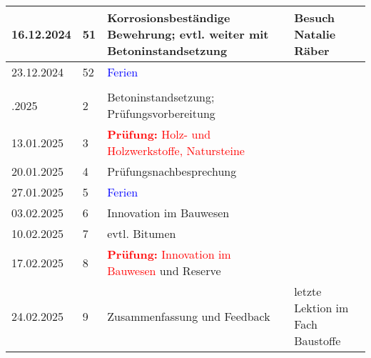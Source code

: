 \documentclass[
11pt,
captions=tableheading,
headings=big,
headsepline,
footsepline, 
captions=tableheading,
parskip=half-,
]{scrartcl}
\newcommand{\red}[1]{\textcolor{red}{#1}}
\begin{document}
\begin{table}[H]
\begin{tabular}{llp{8.5cm}p{3.5cm}}
        16.12.2024     & 51          & Korrosionsbeständige Bewehrung; evtl. weiter mit Betoninstandsetzung           & Besuch Natalie Räber             \\
        \midrule
        23.12.2024     & 52          & \textcolor{blue}{Ferien}                                                       & {}                               \\
        \midrule
        \\ \addlinespace
        \midrule
        06.01.2025     & 2           & Betoninstandsetzung; Prüfungsvorbereitung                                      & {}                               \\
        13.01.2025     & 3           & \red{\textbf{Prüfung:} Holz- und Holzwerkstoffe, Natursteine}                  & {}                               \\
        20.01.2025     & 4           & Prüfungsnachbesprechung                                                        & {}                               \\
        \midrule
        27.01.2025     & 5           & \textcolor{blue}{Ferien}                                                       & {}                               \\
        \midrule
        03.02.2025     & 6           & Innovation im Bauwesen                                                         & {}                               \\
        10.02.2025     & 7           & evtl. Bitumen                                                                  & {}                               \\
        17.02.2025     & 8           & \red{\textbf{Prüfung:} Innovation im Bauwesen} und Reserve                     & {}                               \\
        24.02.2025     & 9           & Zusammenfassung und Feedback                                                   & letzte Lektion im Fach Baustoffe \\
        \bottomrule
    \end{tabular}
\end{table}
\end{document}
